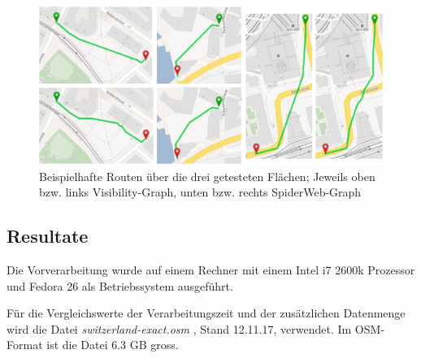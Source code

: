 \begin{figure}[ht]
    \centering
    \includegraphics[width=1\linewidth]{technicalreport/img/algorithm-comparison-routes}
    \caption[Beispielhafte Routen für Natürlichkeits-Test]{Beispielhafte Routen über die drei getesteten Flächen; Jeweils oben bzw. links Visibility-Graph, unten bzw. rechts SpiderWeb-Graph}
    \label{fig:algorithm-example-routes}
\end{figure}


\subsection{Resultate}
\label{eval:Resultate}

Die Vorverarbeitung wurde auf einem Rechner mit einem Intel i7 2600k Prozessor und Fedora 26 als Betriebssystem ausgeführt.

Für die Vergleichswerte der Verarbeitungszeit und der zusätzlichen Datenmenge wird die Datei \emph{switzerland-exact.osm} \cite{osm_data_switzerland}, Stand 12.11.17, verwendet. Im \ac{OSM}-Format ist die Datei 6.3 GB gross.


